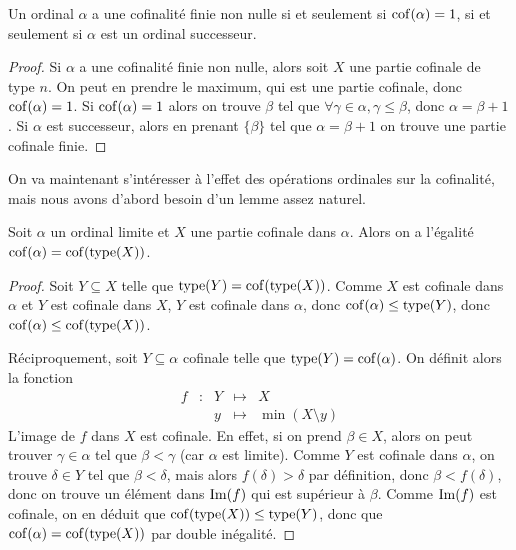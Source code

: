\begin{proposition}
  Un ordinal $\alpha$ a une cofinalité finie non nulle si et seulement si
  $\operatorname{cof}(\alpha) = 1$, si et seulement si $\alpha$ est un ordinal successeur.
\end{proposition}

\begin{proof}
  Si $\alpha$ a une cofinalité finie non nulle, alors soit $X$ une partie
  cofinale de type $n$. On peut en prendre le maximum, qui est une partie
  cofinale, donc $\operatorname{cof}(\alpha) = 1$. Si $\operatorname{cof}(\alpha) = 1$ alors on trouve
  $\beta$ tel que $\forall \gamma \in \alpha, \gamma \leq \beta$, donc
  $\alpha = \beta + 1$. Si $\alpha$ est successeur, alors en prenant $\{\beta\}$
  tel que $\alpha = \beta + 1$ on trouve une partie cofinale finie.
\end{proof}

On va maintenant s'intéresser à l'effet des opérations ordinales sur la
cofinalité, mais nous avons d'abord besoin d'un lemme assez naturel.

\begin{lemma}\label{lem.cof.type}
  Soit $\alpha$ un ordinal limite et $X$ une partie cofinale dans $\alpha$.
  Alors on a l'égalité $\operatorname{cof}(\alpha) = \operatorname{cof}(\operatorname{type}(X))$.
\end{lemma}

\begin{proof}
  Soit $Y\subseteq X$ telle que $\operatorname{type}(Y) = \operatorname{cof}(\operatorname{type}(X))$. Comme $X$ est
  cofinale dans $\alpha$ et $Y$ est cofinale dans $X$, $Y$ est cofinale dans
  $\alpha$, donc $\operatorname{cof}(\alpha) \leq \operatorname{type}(Y)$, donc
  $\operatorname{cof}(\alpha) \leq \operatorname{cof}(\operatorname{type}(X))$.

  Réciproquement, soit $Y\subseteq \alpha$ cofinale telle que
  $\operatorname{type}(Y) = \operatorname{cof}(\alpha)$. On définit alors la fonction
  \[\begin{array}{ccccc}
  f & : & Y & \longmapsto & X\\
  & & y &\longmapsto &\min (X\setminus y)
  \end{array}\]
  L'image de $f$ dans $X$ est cofinale. En effet, si on prend $\beta \in X$,
  alors on peut trouver $\gamma \in \alpha$ tel que $\beta < \gamma$ (car
  $\alpha$ est limite). Comme $Y$ est cofinale dans $\alpha$, on trouve
  $\delta \in Y$ tel que $\beta < \delta$, mais alors $f(\delta) > \delta$
  par définition, donc $\beta < f(\delta)$, donc on trouve un élément dans
  $\operatorname{Im}(f)$ qui est supérieur à $\beta$. Comme $\operatorname{Im}(f)$ est cofinale, on en
  déduit que $\operatorname{cof}(\operatorname{type}(X)) \leq \operatorname{type}(Y)$, donc que
  $\operatorname{cof}(\alpha) = \operatorname{cof}(\operatorname{type}(X))$ par double inégalité.
\end{proof}

